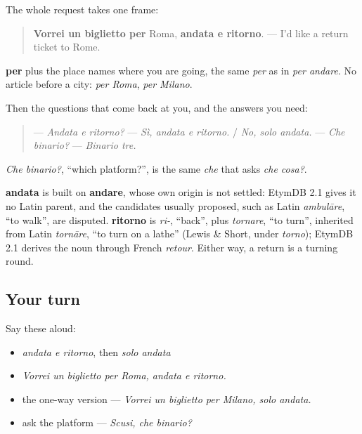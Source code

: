 \begin{grammarlens}[title={Grammar Lens: vorrei un biglietto per…}]
The whole request takes one frame:

\begin{quote}
\textbf{Vorrei un biglietto per} Roma, \textbf{andata e ritorno}. — I'd like a return ticket to Rome.
\end{quote}

\textbf{per} plus the place names where you are going, the same \emph{per} as in \emph{per andare}. No article before a city: \emph{per Roma}, \emph{per Milano}.

Then the questions that come back at you, and the answers you need:

\begin{quote}
— \emph{Andata e ritorno?} — \emph{Sì, andata e ritorno.} / \emph{No, solo andata.} — \emph{Che binario?} — \emph{Binario tre.}
\end{quote}

\emph{Che binario?}, \textquotedblleft{}which platform?\textquotedblright{}, is the same \emph{che} that asks \emph{che cosa?}.
\end{grammarlens}

\begin{cousinweb}
\textbf{andata} is built on \textbf{andare}, whose own origin is not settled: EtymDB 2.1 gives it no Latin parent, and the candidates usually proposed, such as Latin \emph{ambulāre}, \textquotedblleft{}to walk\textquotedblright{}, are disputed. \textbf{ritorno} is \emph{ri-}, \textquotedblleft{}back\textquotedblright{}, plus \emph{tornare}, \textquotedblleft{}to turn\textquotedblright{}, inherited from Latin \emph{tornāre}, \textquotedblleft{}to turn on a lathe\textquotedblright{} (Lewis \& Short, under \emph{torno}); EtymDB 2.1 derives the noun through French \emph{retour}. Either way, a return is a turning round.
\end{cousinweb}

\subsection*{Your turn}
Say these aloud:

\begin{itemize}
\raggedright
  \item \emph{andata e ritorno}, then \emph{solo andata}
  \item \emph{Vorrei un biglietto per Roma, andata e ritorno.}
  \item the one-way version — \emph{Vorrei un biglietto per Milano, solo andata.}
  \item ask the platform — \emph{Scusi, che binario?}
\end{itemize}

